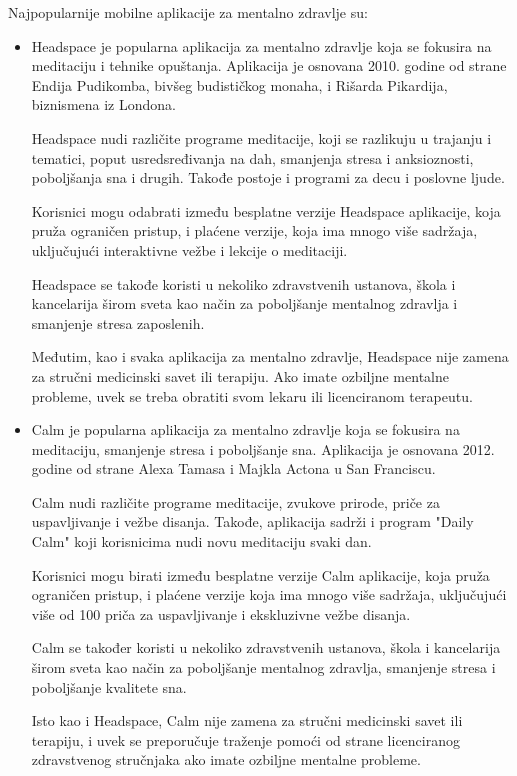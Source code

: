 \documentclass[a4paper]{article}
\begin{document}
Najpopularnije mobilne aplikacije za mentalno zdravlje su:
\begin{itemize}
\item Headspace \cite{prva} je popularna aplikacija za mentalno zdravlje koja se fokusira na meditaciju i tehnike opuštanja. Aplikacija je osnovana 2010. godine od strane Endija Pudikomba, bivšeg budističkog monaha, i Rišarda Pikardija, biznismena iz Londona.

Headspace nudi različite programe meditacije, koji se razlikuju u trajanju i tematici, poput usredsređivanja na dah, smanjenja stresa i anksioznosti, poboljšanja sna i drugih. Takođe postoje i programi za decu i poslovne ljude.

Korisnici mogu odabrati između besplatne verzije Headspace aplikacije, koja pruža ograničen pristup, i plaćene verzije, koja ima mnogo više sadržaja, uključujući interaktivne vežbe i lekcije o meditaciji.

Headspace se takođe koristi u nekoliko zdravstvenih ustanova, škola i kancelarija širom sveta kao način za poboljšanje mentalnog zdravlja i smanjenje stresa zaposlenih.

Međutim, kao i svaka aplikacija za mentalno zdravlje, Headspace nije zamena za stručni medicinski savet ili terapiju. Ako imate ozbiljne mentalne probleme, uvek se treba obratiti svom lekaru ili licenciranom terapeutu.

\item Calm \cite{druga} je popularna aplikacija za mentalno zdravlje koja se fokusira na meditaciju, smanjenje stresa i poboljšanje sna. Aplikacija je osnovana 2012. godine od strane Alexa Tamasa i Majkla Actona u San Franciscu.

Calm nudi različite programe meditacije, zvukove prirode, priče za uspavljivanje i vežbe disanja. Takođe, aplikacija sadrži i program "Daily Calm" koji korisnicima nudi novu meditaciju svaki dan.

Korisnici mogu birati između besplatne verzije Calm aplikacije, koja pruža ograničen pristup, i plaćene verzije koja ima mnogo više sadržaja, uključujući više od 100 priča za uspavljivanje i ekskluzivne vežbe disanja.

Calm se također koristi u nekoliko zdravstvenih ustanova, škola i kancelarija širom sveta kao način za poboljšanje mentalnog zdravlja, smanjenje stresa i poboljšanje kvalitete sna.

Isto kao i Headspace, Calm nije zamena za stručni medicinski savet ili terapiju, i uvek se preporučuje traženje pomoći od strane licenciranog zdravstvenog stručnjaka ako imate ozbiljne mentalne probleme.


\end{itemize}
\end{document}
